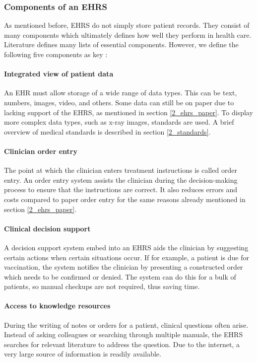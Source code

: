         \subsubsection{Components of an EHRS} \label{ehrs_components}

        As mentioned before, EHRS do not simply store patient records. They consist of many components which ultimately defines how well they perform in health care. Literature defines many lists of essential components. However, we define the following five components as key \cite{biomedical_informatics}:

        \paragraph{Integrated view of patient data} An EHR must allow storage of a wide range of data types. This can be text, numbers, images, video, and others. Some data can still be on paper due to lacking support of the EHRS, as mentioned in section \ref{2_ehrs_paper}. To display more complex data types, such as x-ray images, standards are used. A brief overview of medical standards is described in section \ref{2_standards}.

        \paragraph{Clinician order entry} The point at which the clinician enters treatment instructions is called order entry. An order entry system assists the clinician during the decision-making process to ensure that the instructions are correct. It also reduces errors and costs compared to paper order entry for the same reasons already mentioned in section \ref{2_ehrs_paper}.

        \paragraph{Clinical decision support} A decision support system embed into an EHRS aids the clinician by suggesting certain actions when certain situations occur. If for example, a patient is due for vaccination, the system notifies the clinician by presenting a constructed order which needs to be confirmed or denied. The system can do this for a bulk of patients, so manual checkups are not required, thus saving time.

        \paragraph{Access to knowledge resources} During the writing of notes or orders for a patient, clinical questions often arise. Instead of asking colleagues or searching through multiple manuals, the EHRS searches for relevant literature to address the question. Due to the internet, a very large source of information is readily available.

